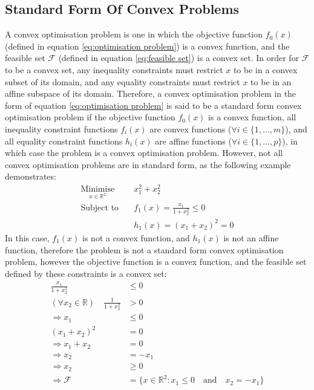 \subsection{Standard Form Of Convex Problems}
A convex optimisation problem is one in which the objective function $f_0(x)$ (defined in equation \ref{eq:optimisation problem}) is a convex function, and the feasible set $\mathcal{F}$ (defined in equation \ref{eq:feasible set}) is a convex set. In order for $\mathcal{F}$ to be a convex set, any inequality constraints must restrict $x$ to be in a convex subset of its domain, and any equality constraints must restrict $x$ to be in an affine subspace of its domain. Therefore, a convex optimisation problem in the form of equation \ref{eq:optimisation problem} is said to be a standard form convex optimisation problem if the objective function $f_0(x)$ is a convex function, all inequality constraint functions $f_i(x)$ are convex functions ($\forall i\in\{1, \hdots, m\}$), and all equality constraint functions $h_i(x)$ are affine functions ($\forall i\in\{1, \hdots, p\}$), in which case the problem is a convex optimisation problem. However, not all convex optimisation problems are in standard form, as the following example demonstrates:
\begin{equation}
\begin{aligned}
    \underset{x \in \mathbb{R}^2}{\text{Minimise}} \quad & x_1^2 + x_2^2 \\
    \text{Subject to} \quad & f_1(x) = \frac{x_1}{1 + x_2^2} \le 0 \\
    & h_1(x) = (x_1 + x_2)^2 = 0
\end{aligned} \label{eq:non standard convex problem}
\end{equation}
In this case, $f_1(x)$ is not a convex function, and $h_1(x)$ is not an affine function, therefore the problem is not a standard form convex optimisation problem, however the objective function is a convex function, and the feasible set defined by these constraints is a convex set:
\begin{align*}
    \frac{x_1}{1 + x_2^2} &\le 0 \\
    (\forall x_2 \in \mathbb{R}) \quad \frac{1}{1 + x_2^2} &> 0 \\
    \Rightarrow x_1 &\le 0 \\
    (x_1 + x_2)^2 &= 0 \\
    \Rightarrow x_1 + x_2 &= 0 \\
    \Rightarrow x_2 &= -x_1 \\
    \Rightarrow x_2 &\ge 0 \\
    \Rightarrow \mathcal{F} &= \{ x\in\mathbb{R}^2: x_1 \le 0 \quad \text{and} \quad x_2 = -x_1 \}
\end{align*}
